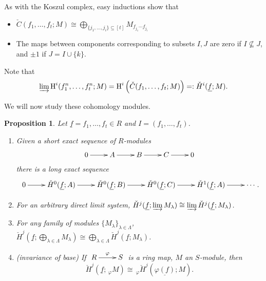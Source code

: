 \documentclass[11pt]{book}
\newtheorem{proposition}[theorem]{Proposition}
\numberwithin{equation}{section}
\numberwithin{theorem}{chapter}
\theoremstyle{definition}
\newtheorem*{basic properties}{Basic Properties}
\newtheorem*{Important Remark}{Important Remark}
\theoremstyle{remark}
\newcommand{\C}{\check{C}}
\renewcommand{\H}{\operatorname{H}}
\begin{document}
As with the Koszul complex, easy inductions show that

\begin{itemize}
	\item $\C(f_1, \ldots, f_t;M) \cong \displaystyle\bigoplus_{\{j_1,\dots,j_i\} \subseteq [t]} M_{f_{j_1} \cdots f_{j_i}}$
	\item The maps between components corresponding to subsets $I, J$ are zero if $I \not\subseteq J$, and $\pm 1$ if $J = I \cup \lbrace k \rbrace$.
\end{itemize}


Note that
$$\varinjlim \H^i (f_1^n, \ldots, f_t^n;M) = \H^i \left( \C (f_1, \ldots, f_t;M) \right) =: \check{H}^i(\underline{f};M).$$







We will now study these cohomology modules.

\begin{proposition}
	Let $\underline{f} = f_1, \ldots, f_t \in R$ and $I = (f_1, \ldots, f_t)$.
	\begin{enumerate}[(1)]
		\item Given a short exact sequence of $R$-modules
		$$\xymatrix{0 \ar[r] & A \ar[r] & B \ar[r] & C \ar[r] & 0}$$
		there is a long exact sequence
		$$\xymatrix{0 \ar[r] & \check{H}^0(\underline{f};A) \ar[r] & \check{H}^0(\underline{f};B) \ar[r] & \check{H}^0(\underline{f};C) \ar[r] & \check{H}^1(\underline{f};A) \ar[r] & \cdots}.$$
		\item For an arbitrary direct limit system, $\check{H}^j(\underline{f}; \varinjlim M_\lambda) \cong \varinjlim \check{H}^j(\underline{f}; M_\lambda)$.
		\item For any family of modules $\{M_\lambda\}_{\lambda\in \Lambda}$, $\check{H}^j(\underline{f}; \bigoplus_{\lambda\in \Lambda} M_\lambda) \cong \bigoplus_{\lambda\in \Lambda} \check{H}^j(\underline{f}; M_\lambda)$.
		\item (invariance of base) If $\xymatrix{R \ar[r]^-\varphi & S}$ is a ring map, $M$ an $S$-module, then
		$$\check{H}^j(\underline{f}; \, _{\varphi} M) \cong \, _{\varphi}\!\check{H}^j(\underline{\varphi({f})};  M).$$
	\end{enumerate}
\end{proposition}
\end{document}
